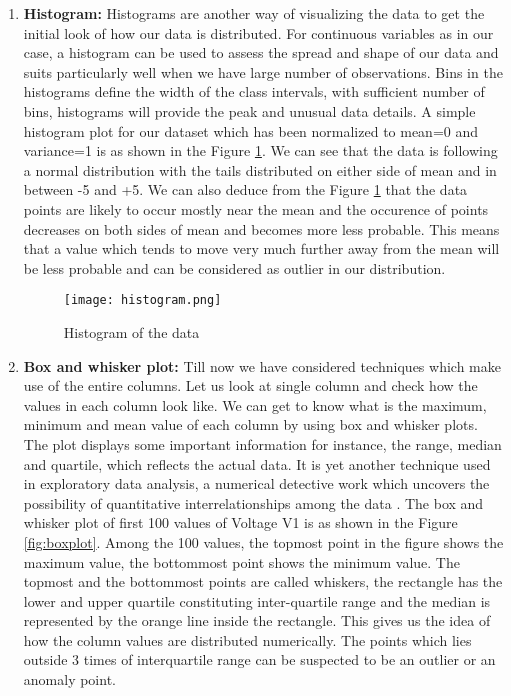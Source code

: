 \begin{enumerate}
\begin{enumerate}
\item\textbf{Histogram:} Histograms are another way of visualizing the data to get the initial look of how our data is distributed. For continuous variables as in our case, a histogram can be used to assess the spread and shape of our data and suits particularly well when we have large number of observations. Bins in the histograms define the width of the class intervals, with sufficient number of bins, histograms will provide the peak and unusual data details. A simple histogram plot for our dataset which has been normalized to mean=0 and variance=1 is as shown in the Figure \ref{fig:hist1}. We can see that the data is following a normal distribution with the tails distributed on either side of mean and in between -5 and +5. We can also deduce from the Figure \ref{fig:hist1} that the data points are likely to occur mostly near the mean and the occurence of points decreases on both sides of mean and becomes more less probable. This means that a value which tends to move very much further away from the mean will be less probable and can be considered as outlier in our distribution. 
\begin{figure}[tph!]
\centerline{\texttt{[image: histogram.png]}}
\caption{Histogram of the data}
\label{fig:hist1}
\end{figure}
\item\textbf{Box and whisker plot:} Till now we have considered techniques which make use of the entire columns. Let us look at single column and check how the values in each column look like. We can get to know what is the maximum, minimum and mean value of each column by using box and whisker plots. The plot displays some important information for instance, the range, median and quartile, which reflects the actual data. It is yet another technique used in exploratory data analysis, a numerical detective work which uncovers the possibility of quantitative interrelationships among the data \cite{larsen1985box}. The box and whisker plot of first 100 values of Voltage V1 is as shown in the Figure \ref{fig:boxplot}. Among the 100 values, the topmost point in the figure shows the maximum value, the bottommost point shows the minimum value. The topmost and the bottommost points are called whiskers, the rectangle has the lower and upper quartile constituting inter-quartile range and the median is represented by the orange line inside the rectangle. This gives us the idea of how the column values are distributed numerically. The points  which lies outside 3 times of interquartile range can be suspected to be an outlier or an anomaly point.

\end{enumerate}
\end{enumerate}
